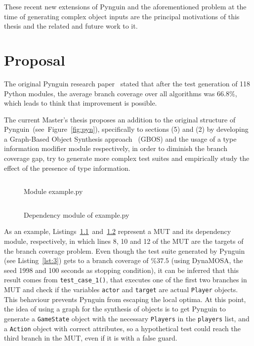 \documentclass[%
  chapterprefix=false,%
  open=right,%
  twoside=true,%
  paper=a4,%
  logofile={Figures/logo.png},%
  thesistype=master,%
  UKenglish,%
]{se2thesis}
\begin{document}
These recent new extensions of Pynguin and the aforementioned problem at the time of generating complex object inputs are the principal motivations of this thesis and the related and future work to it.

\chapter{Proposal}

The original Pynguin research paper~\cite{DBLP:conf/icse/LukasczykF22} stated that after the test generation of 118 Python modules, the average branch coverage over all algorithms was $66.8\%$, which leads to think that improvement is possible.

The current Master's thesis proposes an addition to the original structure of Pynguin~(see~Figure~\ref{fig:pyn}), specifically to sections (5) and (2) by developing a Graph-Based Object Synthesis approach~\cite{DBLP:conf/sigsoft/0001O00D21} (GBOS) and the usage of a type information modifier module respectively, in order to diminish the branch coverage gap, try to generate more complex test suites and empirically study the effect of the presence of type information.

\begin{figure}
    \inputminted[linenos]{python}{Figures/example.py}
    \caption{Module example.py\label{lst:1}}
\end{figure}

\begin{figure}
  \inputminted[linenos]{python}{Figures/dependencies.py}
  \caption{Dependency module of example.py\label{lst:2}}
\end{figure}

As an example, Listings~\ref{lst:1}~and~\ref{lst:2} represent a MUT and its dependency module, respectively, in which lines 8, 10 and 12 of the MUT are the targets of the branch coverage problem.
Even though the test suite generated by Pynguin (see Listing~\ref{lst:3}) gets to a branch coverage of \(\%37.5\) (using DynaMOSA, the seed 1998 and 100 seconds as stopping condition), it can be inferred that this result comes from \verb|test_case_1()|, that executes one of the first two branches in MUT and check if the variables \verb|actor| and \verb|target| are actual \verb|Player| objects.
This behaviour prevents Pynguin from escaping the local optima.
At this point, the idea of using a graph for the synthesis of objects is to get Pynguin to generate a \verb|GameState| object with the necessary \verb|Players| in the \verb|players| list, and a \verb|Action| object with correct attributes, so a hypothetical test could reach the third branch in the MUT, even if it is with a false guard.
  
\end{document}
